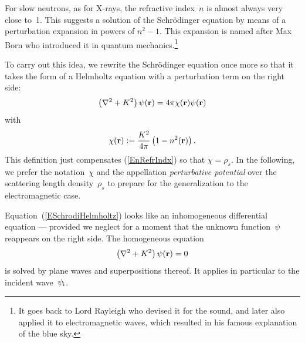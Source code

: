 For slow neutrons, as for X-rays, the refractive index~$n$ is almost always
very close to~1.
This suggests a solution of the Schrödinger equation
by means of a perturbation expansion in powers of $n^2-1$.
This expansion is named after Max Born
who introduced it in quantum mechanics.\footnote
{It goes back to Lord Rayleigh
who devised it for the sound,
and later also applied it to electromagnetic waves,
which resulted in his famous explanation of the blue sky.}

To carry out this idea, we rewrite the Schrödinger equation
once more so that it takes the form of a Helmholtz equation
%
with a perturbation term on the right side:
\begin{equation}\label{ESchrodiHelmholtz}
  \left(\mathbf{\nabla}^2+K^2\right)\psi(\mathbf{r})
  = 4\pi\chi(\mathbf{r})\psi(\mathbf{r})
\end{equation}
with
\begin{equation}\label{EChiDef}
  \chi(\mathbf{r}) := \frac{K^2}{4\pi}\left(1-n^2(\mathbf{r})\right).
\end{equation}
%
This definition just compensates (\ref{EnRefrIndx}) so that $\chi=\rho_s$.
In the following, we prefer the notation~$\chi$
and the appellation \textit{perturbative potential}
%
%
over the scattering length density~$\rho_s$
to prepare for the generalization to the electromagnetic case.

Equation~(\ref{ESchrodiHelmholtz}) looks
like an inhomogeneous differential equation ---
provided we neglect for a moment that the unknown function~$\psi$
reappears on the right side.
The homogeneous equation
\begin{equation}\label{EHelmholtzHomog}
  \left(\mathbf{\nabla}^2+K^2\right)\psi(\mathbf{r}) = 0
\end{equation}
is solved by plane waves and superpositions thereof.
It applies in particular to the incident wave~$\psi_{\text{i}}$.


